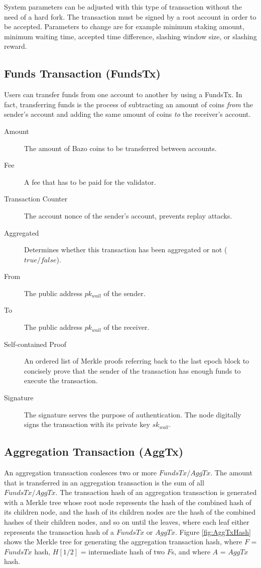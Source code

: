 System parameters can be adjusted with this type of transaction without the need of a hard fork. The transaction must be signed by a root account in order to be accepted. Parameters to change are for example minimum staking amount, minimum waiting time, accepted time difference, slashing window size, or slashing reward.

\subsection{Funds Transaction (FundsTx)}
\label{Impl:FundsTx}

Users can transfer funds from one account to another by using a FundsTx. In fact, transferring funds is the process of subtracting an amount of coins \textit{from} the sender's account and adding the same amount of coins \textit{to} the receiver's account.

\begin{description}
  \item[Amount] The amount of Bazo coins to be transferred between accounts.
  \item[Fee] A fee that has to be paid for the validator.
  \item[Transaction Counter] The account nonce of the sender's account, prevents replay attacks.
  \item[Aggregated] Determines whether this transaction has been aggregated or not ($true/false$).
  \item[From] The public address $pk_{wall}$ of the sender.
  \item[To] The public address $pk_{wall}$ of the receiver.
  \item[Self-contained Proof] An ordered list of Merkle proofs referring back to the last epoch block to concisely prove that the sender of the transaction has enough funds to execute the transaction.
  \item[Signature] The signature serves the purpose of authentication. The node digitally signs the transaction with its private key $sk_{wall}$.
\end{description}

\subsection{Aggregation Transaction (AggTx)}

An aggregation transaction coalesces two or more $FundsTx/AggTx$. The amount that is transferred in an aggregation transaction is the sum of all $FundsTx/AggTx$. The transaction hash of an aggregation transaction is generated with a Merkle tree whose root node represents the hash of the combined hash of its children node, and the hash of its children nodes are the hash of the combined hashes of their children nodes, and so on until the leaves, where each leaf either represents the transaction hash of a $FundsTx$ or $AggTx$. Figure \ref{fig:AggTxHash} shows the Merkle tree for generating the aggregation transaction hash\label{fig:AggTxHash}, where $F$ = $FundsTx$ hash, $H[1/2]$ = intermediate hash of two $F$s, and where $A$ = $AggTx$ hash.

